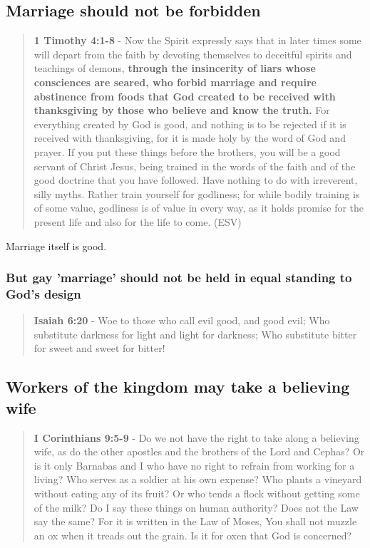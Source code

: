 \documentclass[11pt]{article}
\begin{document}
\subsection{Marriage should not be forbidden}
\label{sec:orgb94cd75}
\begin{quote}
\textbf{1 Timothy 4:1-8} - Now the Spirit expressly says that in later times some will depart from the faith by devoting themselves to deceitful spirits and teachings of demons, \textbf{through the insincerity of liars whose consciences are seared, who forbid marriage and require abstinence from foods that God created to be received with thanksgiving by those who believe and know the truth.} For everything created by God is good, and nothing is to be rejected if it is received with thanksgiving, for it is made holy by the word of God and prayer. If you put these things before the brothers, you will be a good servant of Christ Jesus, being trained in the words of the faith and of the good doctrine that you have followed. Have nothing to do with irreverent, silly myths. Rather train yourself for godliness; for while bodily training is of some value, godliness is of value in every way, as it holds promise for the present life and also for the life to come. (ESV)
\end{quote}

Marriage itself is good.

\subsubsection{But gay 'marriage' should not be held in equal standing to God's design}
\label{sec:org2bdaab1}

\begin{quote}
\textbf{Isaiah 6:20} - Woe to those who call evil good, and good evil; Who substitute darkness for light and light for darkness; Who substitute bitter for sweet and sweet for bitter!
\end{quote}

\subsection{Workers of the kingdom may take a believing wife}
\label{sec:org1ee737e}
\begin{quote}
\textbf{I Corinthians 9:5-9} - Do we not have the right to take along a believing wife, as do the other apostles and the brothers of the Lord and Cephas? Or is it only Barnabas and I who have no right to refrain from working for a living? Who serves as a soldier at his own expense? Who plants a vineyard without eating any of its fruit? Or who tends a flock without getting some of the milk? Do I say these things on human authority? Does not the Law say the same? For it is written in the Law of Moses, You shall not muzzle an ox when it treads out the grain. Is it for oxen that God is concerned?
\end{quote}
\end{document}
